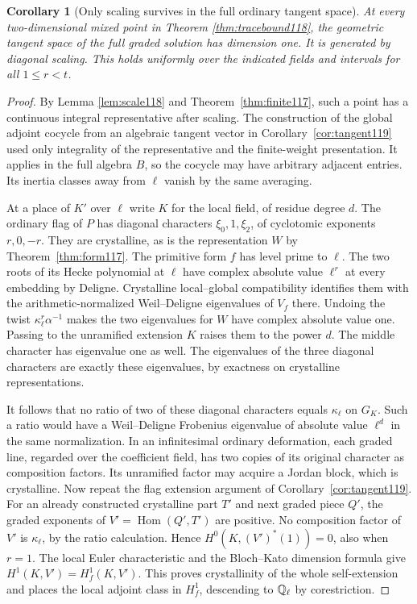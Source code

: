 \documentclass[a4paper,11pt]{article}
\newtheorem{corollary}[proposition]{Corollary}
\theoremstyle{definition}
\theoremstyle{remark}
\numberwithin{equation}{section}
\begin{document}
\begin{corollary}[Only scaling survives in the full ordinary tangent space]
\label{cor:corner120}
At every two-dimensional mixed point in
Theorem \ref{thm:tracebound118},
the geometric tangent space of the full graded solution has
dimension one. It is generated by diagonal scaling. This
holds uniformly over the indicated fields and intervals for
all \(1\le r<t\).
\end{corollary}
\begin{proof}
By Lemma \ref{lem:scale118} and Theorem~\ref{thm:finite117},
such a point has a continuous integral representative after
scaling. The construction of the global adjoint cocycle from
an algebraic tangent vector in Corollary~\ref{cor:tangent119}
used only integrality of the representative and the finite-weight
presentation. It applies in the full algebra \(B\), so the
cocycle may have arbitrary adjacent entries. Its inertia
classes away from \(\ell\) vanish by the same averaging.

At a place of \(K'\) over \(\ell\) write \(K\) for the local
field, of residue degree \(d\). The ordinary flag of \(P\)
has diagonal characters \(\xi_0,1,\xi_2\), of cyclotomic
exponents \(r,0,-r\). They are crystalline, as is the
representation \(W\) by Theorem~\ref{thm:form117}.
The primitive form \(f\) has level prime to \(\ell\). The two
roots of its Hecke polynomial at \(\ell\) have complex
absolute value \(\ell^r\) at every embedding by Deligne.
Crystalline local--global compatibility identifies them with
the arithmetic-normalized Weil--Deligne eigenvalues of \(V_f\)
there. Undoing the twist \(\kappa_\ell^r\alpha^{-1}\)
makes the two eigenvalues for \(W\) have complex absolute
value one. Passing to the unramified extension \(K\) raises
them to the power \(d\). The middle character has eigenvalue
one as well. The eigenvalues of the three diagonal characters
are exactly these eigenvalues, by exactness on crystalline
representations.~\cite{VI-IV-VI-deligne40,VI-IV-VI-saito40}

It follows that no ratio of two of these diagonal characters
equals \(\kappa_\ell\) on \(G_K\). Such a ratio would have a
Weil--Deligne Frobenius eigenvalue of absolute value
\(\ell^d\) in the same normalization. In an infinitesimal
ordinary deformation, each graded line, regarded over the
coefficient field, has two copies of its original character
as composition factors. Its unramified factor may acquire a
Jordan block, which is crystalline. Now repeat the flag
extension argument of Corollary~\ref{cor:tangent119}.
For an already constructed crystalline part \(T'\) and next
graded piece \(Q'\), the graded exponents of
\(V'=\operatorname{Hom}(Q',T')\) are positive. No composition
factor of \(V'\) is \(\kappa_\ell\), by the ratio calculation.
Hence \(H^0(K,(V')^*(1))=0\), also when \(r=1\). The local
Euler characteristic and the Bloch--Kato dimension formula
give \(H^1(K,V')=H^1_f(K,V')\). This proves crystallinity of
the whole self-extension and places the local adjoint class
in \(H_f^1\), descending to \(\mathbb Q_\ell\) by corestriction.


\end{proof}
\end{document}
